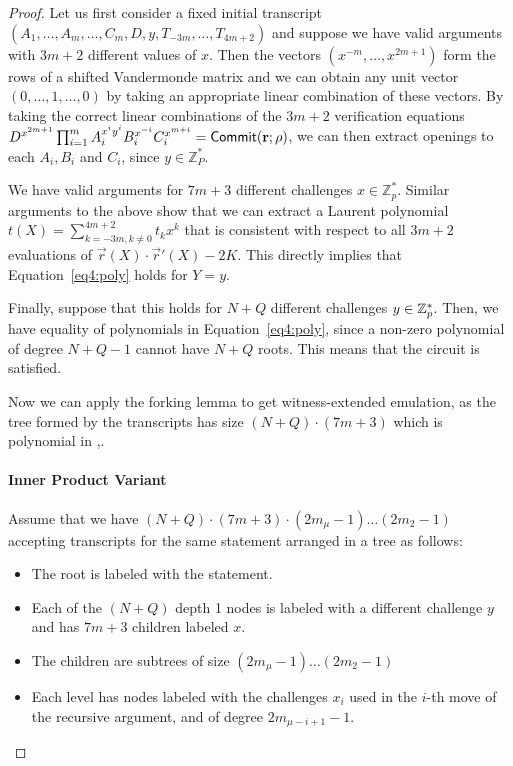 \begin{proof}
Let us first consider a fixed initial transcript $(A_{1},\ldots,A_m,\ldots,C_{m},D,y,T_{-3m},\ldots,T_{4m+2})$ and suppose we have valid arguments with $3m+2$ different values of $x$. Then the vectors $(x^{-m},\ldots,x^{2m+1})$ form the rows of a shifted Vandermonde matrix and we can obtain any unit vector $(0,\ldots,1,\ldots,0)$ by taking an appropriate linear combination of these vectors. By taking the correct linear combinations of the $3m+2$ verification equations $D^{x^{2m+1}}\prod_{i=1}^m A_{i}^{x^i y^i}B_{i}^{x^{-i}}C_{i}^{x^{m+i}}=\mathsf{Commit}(\mathbf{r};\rho)$, we can then extract openings to each $A_{i},B_i$ and $C_i$, since $y\in \mathbb{Z}_P^*$.

We have valid arguments for $7m+3$ different challenges $x \in \mathbb{Z}_p^*$. Similar arguments to the above show that we can extract a Laurent polynomial $t(X) = \sum_{k=-3m,k\neq 0}^{4m+2} t_k x^k$ that is consistent with respect to all $3m+2$ evaluations of $\vec{r}(X) \cdot \vec{r}'(X) - 2K$. This directly implies that Equation~\ref{eq4:poly} holds for $Y=y$.

Finally, suppose that this holds for $N+Q$ different challenges $y\in \mathbb{Z}_p^*$. Then, we have equality of polynomials in Equation~\ref{eq4:poly}, since a non-zero polynomial of degree $N+Q-1$ cannot have $N+Q$ roots. This means that the circuit is satisfied.

Now we can apply the forking lemma to get witness-extended emulation, as the tree formed by the transcripts has size $(N+Q)\cdot(7m+3)$ which is polynomial in \sep.

\paragraph{Inner Product Variant} Assume that we have $(N+Q)\cdot(7m+3)\cdot(2m_{\mu}-1)\ldots(2m_2-1)$ accepting transcripts for the same statement arranged in a tree as follows:
\begin{itemize}
\item The root is labeled with the statement.
\item Each of the $(N+Q)$ depth 1 nodes is labeled with a different challenge $y$ and has $7m+3$ children labeled $x$.
\item The children are subtrees of size $(2m_{\mu}-1)\ldots(2m_2-1)$
\item Each level has nodes labeled with the challenges $x_i$ used in the $i$-th move of the recursive argument, and of degree $2m_{\mu-i+1}-1$.
\end{itemize}


\end{proof}
